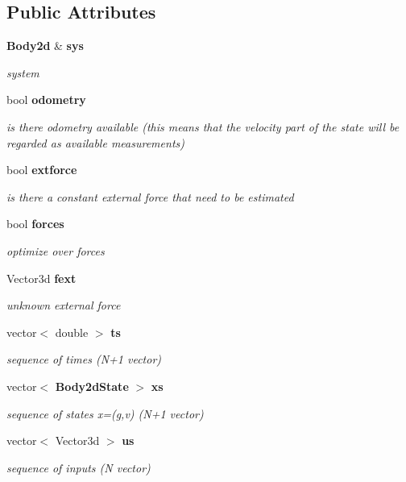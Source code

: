 \subsection*{\-Public \-Attributes}
\begin{DoxyCompactItemize}
\item 
{\bf \-Body2d} \& {\bf sys}
\begin{DoxyCompactList}\small\item\em system \end{DoxyCompactList}\item 
bool {\bf odometry}
\begin{DoxyCompactList}\small\item\em is there odometry available (this means that the velocity part of the state will be regarded as available measurements) \end{DoxyCompactList}\item 
bool {\bf extforce}
\begin{DoxyCompactList}\small\item\em is there a constant external force that need to be estimated \end{DoxyCompactList}\item 
bool {\bf forces}
\begin{DoxyCompactList}\small\item\em optimize over forces \end{DoxyCompactList}\item 
\-Vector3d {\bf fext}
\begin{DoxyCompactList}\small\item\em unknown external force \end{DoxyCompactList}\item 
vector$<$ double $>$ {\bf ts}
\begin{DoxyCompactList}\small\item\em sequence of times (\-N+1 vector) \end{DoxyCompactList}\item 
vector$<$ {\bf \-Body2d\-State} $>$ {\bf xs}
\begin{DoxyCompactList}\small\item\em sequence of states x=(g,v) (\-N+1 vector) \end{DoxyCompactList}\item 
vector$<$ \-Vector3d $>$ {\bf us}
\begin{DoxyCompactList}\small\item\em sequence of inputs (\-N vector) \end{DoxyCompactList}\item 

\end{DoxyCompactItemize}
